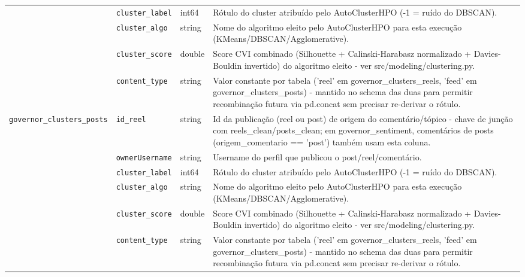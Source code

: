 \begin{footnotesize}
\begin{longtable}{p{3.2cm}p{3.0cm}p{2.0cm}p{6.0cm}}
\texttt{} & \texttt{cluster\_\allowbreak{}label} & int64 & Rótulo do cluster atribuído pelo AutoClusterHPO (-1 = ruído do DBSCAN). \\
\texttt{} & \texttt{cluster\_\allowbreak{}algo} & string & Nome do algoritmo eleito pelo AutoClusterHPO para esta execução (KMeans/\allowbreak{}DBSCAN/\allowbreak{}Agglomerative). \\
\texttt{} & \texttt{cluster\_\allowbreak{}score} & double & Score CVI combinado (Silhouette + Calinski-Harabasz normalizado + Davies-Bouldin invertido) do algoritmo eleito - ver src/\allowbreak{}modeling/\allowbreak{}clustering.py. \\
\texttt{} & \texttt{content\_\allowbreak{}type} & string & Valor constante por tabela ('reel' em governor\_\allowbreak{}clusters\_\allowbreak{}reels, 'feed' em governor\_\allowbreak{}clusters\_\allowbreak{}posts) - mantido no schema das duas para permitir recombinação futura via pd.concat sem precisar re-derivar o rótulo. \\
\texttt{governor\_\allowbreak{}clusters\_\allowbreak{}posts} & \texttt{id\_\allowbreak{}reel} & string & Id da publicação (reel ou post) de origem do comentário/\allowbreak{}tópico - chave de junção com reels\_\allowbreak{}clean/\allowbreak{}posts\_\allowbreak{}clean; em governor\_\allowbreak{}sentiment, comentários de posts (origem\_\allowbreak{}comentario == 'post') também usam esta coluna. \\
\texttt{} & \texttt{ownerUsername} & string & Username do perfil que publicou o post/\allowbreak{}reel/\allowbreak{}comentário. \\
\texttt{} & \texttt{cluster\_\allowbreak{}label} & int64 & Rótulo do cluster atribuído pelo AutoClusterHPO (-1 = ruído do DBSCAN). \\
\texttt{} & \texttt{cluster\_\allowbreak{}algo} & string & Nome do algoritmo eleito pelo AutoClusterHPO para esta execução (KMeans/\allowbreak{}DBSCAN/\allowbreak{}Agglomerative). \\
\texttt{} & \texttt{cluster\_\allowbreak{}score} & double & Score CVI combinado (Silhouette + Calinski-Harabasz normalizado + Davies-Bouldin invertido) do algoritmo eleito - ver src/\allowbreak{}modeling/\allowbreak{}clustering.py. \\
\texttt{} & \texttt{content\_\allowbreak{}type} & string & Valor constante por tabela ('reel' em governor\_\allowbreak{}clusters\_\allowbreak{}reels, 'feed' em governor\_\allowbreak{}clusters\_\allowbreak{}posts) - mantido no schema das duas para permitir recombinação futura via pd.concat sem precisar re-derivar o rótulo. \\

\end{longtable}
\end{footnotesize}
